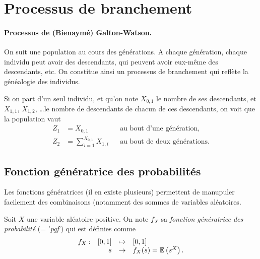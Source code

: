 \section{Processus de branchement} \label{sec:Proba-Branchement}

\paragraph*{Processus de (Bienaymé) Galton-Watson.}
On suit une population au cours des générations. A chaque génération, chaque individu peut avoir des descendants, qui peuvent avoir eux-même des descendants, etc. On constitue ainsi un processus de branchement qui reflète la généalogie des individus.

Si on part d'un seul individu, et qu'on note $X_{0, 1}$ le nombre de ses descendants, et $X_{1, 1}$, $X_{1, 2}$, \dots le nombre de descendants de chacun de ces descendants, on voit que la population vaut
\begin{align*}
  Z_1 & = X_{0, 1} && \text{au bout d'une génération}, \\
  Z_2 & = \sum_{i=1}^{X_{0, 1}} X_{1, i} && \text{au bout de deux générations}.
\end{align*}

\subsection{Fonction génératrice des probabilités} 

Les fonctions génératrices (il en existe plusieurs) permettent de manupuler facilement des combinaisons (notamment des sommes de variables aléatoires.

\begin{definition*}
  Soit $X$ une variable aléatoire positive. On note $f_X$ sa {\em fonction génératrice des probabilité} (= '{\em pgf}') qui est définies comme
  $$
  \begin{array}{rrcl}
    f_X : & [0, 1] & \mapsto & [0, 1] \\
      & s & \rightarrow & f_X(s) = \operatorname{\mathbb{E}}\left(s^X\right).
  \end{array}
  $$
\end{definition*}

